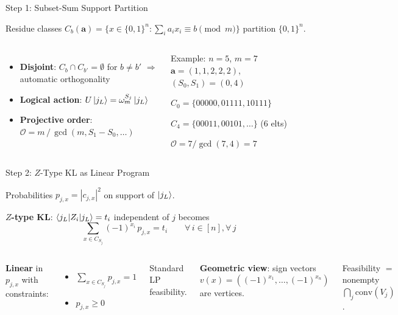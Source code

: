\documentclass[aspectratio=169,t]{beamer}
\newcommand{\Fintwo}{\{0,1\}}
\begin{document}
\begin{frame}{Step 1: Subset-Sum Support Partition}

Residue classes
$C_b(\mathbf{a})
  = 
  \bigl\{x\in\Fintwo^n :
    \sum_i a_i x_i \equiv b \pmod{m}\bigr\}$
partition $\Fintwo^n$.

\begin{columns}[T]
\begin{itemize}
\item \textbf{Disjoint}: $C_b\cap C_{b'} = \emptyset$ for $b\neq b'$
  $ \Rightarrow$ automatic orthogonality
\item \textbf{Logical action}:
  $U\ket{j_L} = \omega_m^{S_j}\ket{j_L}$
\item \textbf{Projective order}:
  $\mathcal{O} = m\,/\,\gcd(m,S_1-S_0,\ldots)$
\end{itemize}

\begin{exampleblock}{Example: $n{=}5$, $m{=}7$}
$\mathbf{a}{=}(1,1,2,2,2)$, $(S_0,S_1)=(0,4)$

$C_0 = \{00000, 01111, 10111\}$

$C_4 = \{00011, 00101, \ldots\}$ (6 elts)

$\mathcal{O}=7/\gcd(7,4)=7$
\end{exampleblock}
\end{columns}
\end{frame}

\begin{frame}{Step 2: $Z$-Type KL as Linear Program}

Probabilities $p_{j,x}=|c_{j,x}|^2$ on support of $\ket{j_L}$.

\textbf{$Z$-type KL}: $\braket{j_L|Z_i|j_L}=t_i$ independent of $j$ becomes
\[
  \boxed{ \sum_{x\in C_{S_j}}\! (-1)^{x_i}\, p_{j,x} =  t_i
  \qquad\forall\, i\in[n], \forall\, j }
\]

\begin{columns}[T]
\textbf{Linear} in $p_{j,x}$ with constraints:
\begin{itemize}
\item $\sum_{x\in C_{S_j}} p_{j,x} = 1$
\item $p_{j,x} \geq 0$
\end{itemize}
Standard LP feasibility.

\textbf{Geometric view}: sign vectors
$v(x)=((-1)^{x_1},\ldots,(-1)^{x_n})$
are vertices.

Feasibility $=$ nonempty
$\bigcap_{j}\mathrm{conv}(V_j)$.
\end{columns}
\end{frame}
\end{document}
